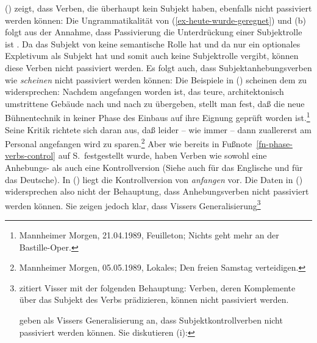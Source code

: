 () zeigt, dass Verben, die überhaupt kein Subjekt haben, ebenfalls nicht passiviert werden können:
\eal
{}
\zl
Die Ungrammatikalität von (\ref{ex-heute-wurde-geregnet}) und (b) folgt
aus der Annahme, dass Passivierung die Unterdrückung einer Subjektrolle\label{ex-ps-demotion-subject-role}
ist \citep[]{ps2}. Da das Subjekt von 
keine semantische Rolle hat und da  nur ein optionales Expletivum
als Subjekt hat und somit auch keine
Subjektrolle vergibt, können diese Verben nicht passiviert werden.
Es folgt auch, dass Subjektanhebungsverben wie \zb \emph{scheinen} nicht passiviert
werden können:\label{subjekt-raising-kein-passiv}
\z
Die Beispiele in () scheinen dem zu widersprechen:
\eal
\ex Nachdem angefangen worden ist, das teure, architektonisch umstrittene Gebäude nach und nach zu übergeben, 
    stellt man fest, daß die neue Bühnentechnik in keiner Phase des Einbaus auf ihre Eignung geprüft worden ist.\footnote{
Mannheimer Morgen, 21.04.1989, Feuilleton; Nichts geht mehr an der Bastille-Oper.%
        }
\ex Seine Kritik richtete sich daran aus, daß leider -- wie immer -- dann zuallererst am Personal angefangen wird zu sparen.\footnote{
       Mannheimer Morgen, 05.05.1989, Lokales; Den freien Samstag verteidigen.%
}
\zl
Aber wie bereits in Fußnote~\ref{fn-phase-verbs-control} auf S.\,\pageref{fn-phase-verbs-control} festgestellt
wurde, haben Verben wie  sowohl eine Anhebungs- als auch
eine Kontrollversion (Siehe auch  für das Englische
und  für das Deutsche). In () liegt die Kontrollversion von \emph{anfangen} vor.
Die Daten in () widersprechen also nicht der Behauptung, dass Anhebungsverben nicht passiviert
werden können. Sie zeigen jedoch klar, 
dass Vissers Generalisierung\footnote{
        \citet[]{Bresnan82c} zitiert Visser mit der folgenden Behauptung:
        Verben, deren Komplemente über das Subjekt des Verbs prädizieren, können nicht passiviert werden.

        \citet[]{ps2} geben als Vissers Generalisierung an,
        dass Subjektkontrollverben nicht passiviert werden können.
        Sie diskutieren (i):
        \eal
        \zllast
}
